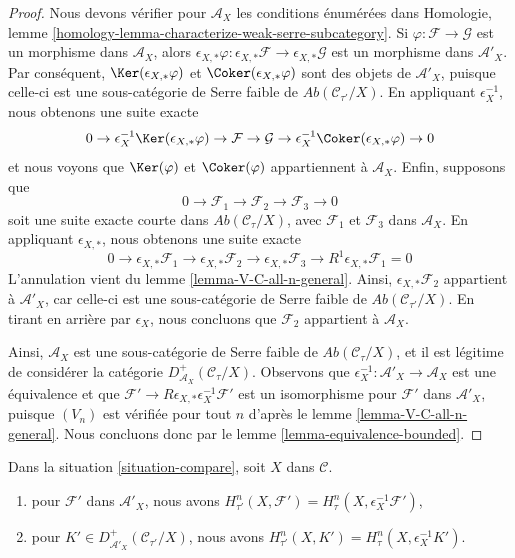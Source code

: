 \begin{proof}
Nous devons vérifier pour $\mathcal{A}_X$ les conditions énumérées dans
Homologie, lemme \ref{homology-lemma-characterize-weak-serre-subcategory}.
Si $\varphi : \mathcal{F} \to \mathcal{G}$ est un morphisme dans
$\mathcal{A}_X$, alors $\epsilon_{X, *}\varphi :
\epsilon_{X, *}\mathcal{F} \to \epsilon_{X, *}\mathcal{G}$
est un morphisme dans $\mathcal{A}'_X$. Par conséquent,
$\Ker(\epsilon_{X, *}\varphi)$ et $\Coker(\epsilon_{X, *}\varphi)$ sont des
objets de $\mathcal{A}'_X$, puisque celle-ci est une sous-catégorie de Serre
faible de $\textit{Ab}(\mathcal{C}_{\tau'}/X)$. En appliquant
$\epsilon_X^{-1}$, nous obtenons une suite exacte
$$
0 \to
\epsilon_X^{-1}\Ker(\epsilon_{X, *}\varphi) \to
\mathcal{F} \to \mathcal{G} \to
\epsilon_X^{-1}\Coker(\epsilon_{X, *}\varphi) \to 0
$$
et nous voyons que $\Ker(\varphi)$ et $\Coker(\varphi)$ appartiennent à
$\mathcal{A}_X$. Enfin, supposons que
$$
0 \to \mathcal{F}_1 \to \mathcal{F}_2 \to \mathcal{F}_3 \to 0
$$
soit une suite exacte courte dans $\textit{Ab}(\mathcal{C}_\tau/X)$,
avec $\mathcal{F}_1$ et $\mathcal{F}_3$ dans $\mathcal{A}_X$.
En appliquant $\epsilon_{X, *}$, nous obtenons une suite exacte
$$
0 \to 
\epsilon_{X, *}\mathcal{F}_1 \to
\epsilon_{X, *}\mathcal{F}_2 \to
\epsilon_{X, *}\mathcal{F}_3 \to
R^1\epsilon_{X, *}\mathcal{F}_1 = 0
$$
L'annulation vient du lemme \ref{lemma-V-C-all-n-general}.
Ainsi, $\epsilon_{X, *}\mathcal{F}_2$ appartient à $\mathcal{A}'_X$, car
celle-ci est une sous-catégorie de Serre faible de
$\textit{Ab}(\mathcal{C}_{\tau'}/X)$. En tirant en arrière par $\epsilon_X$,
nous concluons que $\mathcal{F}_2$ appartient à $\mathcal{A}_X$.

\medskip\noindent
Ainsi, $\mathcal{A}_X$ est une sous-catégorie de Serre faible de
$\textit{Ab}(\mathcal{C}_\tau/X)$, et il est légitime de considérer la
catégorie $D^+_{\mathcal{A}_X}(\mathcal{C}_\tau/X)$.
Observons que $\epsilon_X^{-1} : \mathcal{A}'_X \to \mathcal{A}_X$
est une équivalence et que
$\mathcal{F}' \to R\epsilon_{X, *}\epsilon_X^{-1}\mathcal{F}'$
est un isomorphisme pour $\mathcal{F}'$ dans $\mathcal{A}'_X$, puisque
$(V_n)$ est vérifiée pour tout $n$ d'après le
lemme \ref{lemma-V-C-all-n-general}. Nous concluons donc par le
lemme \ref{lemma-equivalence-bounded}.
\end{proof}

\begin{lemma}
\label{lemma-compare-cohomology-general}
Dans la situation \ref{situation-compare}, soit $X$ dans $\mathcal{C}$.
\begin{enumerate}
\item pour $\mathcal{F}'$ dans $\mathcal{A}'_X$, nous avons
$H^n_{\tau'}(X, \mathcal{F}') = H^n_\tau(X, \epsilon_X^{-1}\mathcal{F}')$,
\item pour $K' \in D^+_{\mathcal{A}'_X}(\mathcal{C}_{\tau'}/X)$,
nous avons $H^n_{\tau'}(X, K') = H^n_\tau(X, \epsilon_X^{-1}K')$.
\end{enumerate}
\end{lemma}

